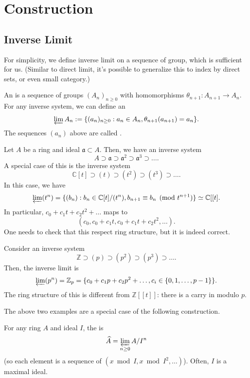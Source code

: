 \section{Construction}
\subsection{Inverse Limit}
For simplicity, we define inverse limit on 
a sequence of group, which is sufficient for us.
(Similar to direct limit, it's possible to generalize this to
index by direct sets, or even small category.)
\begin{definition}
    An  is a sequence of groups $(A_n)_{n\geq 0}$
with homomorphisms $\theta_{n+1} : A_{n+1}\to A_n$.
For any inverse system, we can define an 
$$\varprojlim A_n := \{(a_n)_{n\geq 0} : a_n\in A_n,
\theta_{n+1}(a_{n+1}) = a_n\}.$$
The sequences $(a_n)$ above are called .
\end{definition}
\begin{example}
    Let $A$ be a ring and ideal $\mathfrak a\subset A$.
    Then, we have an inverse system
    $$A\supset\mathfrak a\supset\mathfrak a^2\supset\mathfrak a^3
    \supset\dots.$$
    A special case of this is the inverse system
    $$\mathbb C[t] \supset (t)\supset (t^2)\supset (t^3)\supset\dots.$$
    In this case, we have
    $$\varprojlim (t^n) = \{(b_n) : b_n\in\mathbb C[t]/(t^n),
    b_{n+1}\equiv b_n\pmod{t^{n+1}}\}\simeq\mathbb C[[t].$$
    In particular, $c_0+c_1t+c_2t^2+\dots$ maps to
    $$(c_0, c_0+c_1t, c_0+c_1t+c_2t^2, \dots).$$
    One needs to check that this respect ring structure,
    but it is indeed correct.
\end{example}
\begin{example}
    Consider an inverse system
    $$\mathbb Z\supset (p) \supset (p^2)\supset (p^3)\supset\dots.$$
    Then, the inverse limit is
    $$\varprojlim (p^n) = \mathbb Z_p
    = \{c_0+c_1p+c_2p^2+\dots, c_i\in\{0,1,\dots,p-1\}\}.$$
    The ring structure of this is different from $\mathbb Z[[t]]$:
    there is a carry in modulo $p$.
\end{example}
The above two examples are a special case of the following
construction.
\begin{definition}
    For any ring $A$ and ideal $I$, the  is
    $$\widehat A = \varprojlim_{n\geq 0} A/I^n$$
    (so each element is a sequence of $(x\bmod I, x\bmod I^2,\dots)$). Often, $I$ is a maximal ideal.
\end{definition}
